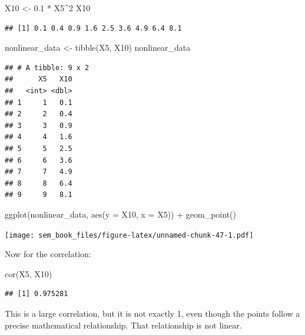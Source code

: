 \documentclass[
]{book}
\newenvironment{Shaded}{\begin{snugshade}}{\end{snugshade}}
\newcommand{\AttributeTok}[1]{\textcolor[rgb]{0.77,0.63,0.00}{#1}}
\newcommand{\DecValTok}[1]{\textcolor[rgb]{0.00,0.00,0.81}{#1}}
\newcommand{\FloatTok}[1]{\textcolor[rgb]{0.00,0.00,0.81}{#1}}
\newcommand{\FunctionTok}[1]{\textcolor[rgb]{0.00,0.00,0.00}{#1}}
\newcommand{\NormalTok}[1]{#1}
\newcommand{\OtherTok}[1]{\textcolor[rgb]{0.56,0.35,0.01}{#1}}
\newcommand{\SpecialCharTok}[1]{\textcolor[rgb]{0.00,0.00,0.00}{#1}}
\begin{document}
\begin{Shaded}
\begin{Highlighting}[]
\NormalTok{X10 }\OtherTok{\textless{}{-}} \FloatTok{0.1} \SpecialCharTok{*}\NormalTok{ X5}\SpecialCharTok{\^{}}\DecValTok{2}
\NormalTok{X10}
\end{Highlighting}
\end{Shaded}

\begin{verbatim}
## [1] 0.1 0.4 0.9 1.6 2.5 3.6 4.9 6.4 8.1
\end{verbatim}

\begin{Shaded}
\begin{Highlighting}[]
\NormalTok{nonlinear\_data }\OtherTok{\textless{}{-}} \FunctionTok{tibble}\NormalTok{(X5, X10)}
\NormalTok{nonlinear\_data}
\end{Highlighting}
\end{Shaded}

\begin{verbatim}
## # A tibble: 9 x 2
##      X5   X10
##   <int> <dbl>
## 1     1   0.1
## 2     2   0.4
## 3     3   0.9
## 4     4   1.6
## 5     5   2.5
## 6     6   3.6
## 7     7   4.9
## 8     8   6.4
## 9     9   8.1
\end{verbatim}

\begin{Shaded}
\begin{Highlighting}[]
\FunctionTok{ggplot}\NormalTok{(nonlinear\_data, }\FunctionTok{aes}\NormalTok{(}\AttributeTok{y =}\NormalTok{ X10, }\AttributeTok{x =}\NormalTok{ X5)) }\SpecialCharTok{+}
    \FunctionTok{geom\_point}\NormalTok{()}
\end{Highlighting}
\end{Shaded}

\texttt{[image: sem\_book\_files/figure-latex/unnamed-chunk-47-1.pdf]}

Now for the correlation:

\begin{Shaded}
\begin{Highlighting}[]
\FunctionTok{cor}\NormalTok{(X5, X10)}
\end{Highlighting}
\end{Shaded}

\begin{verbatim}
## [1] 0.975281
\end{verbatim}

This is a large correlation, but it is not exactly 1, even though the points follow a precise mathematical relationship. That relationship is not linear.
\end{document}

